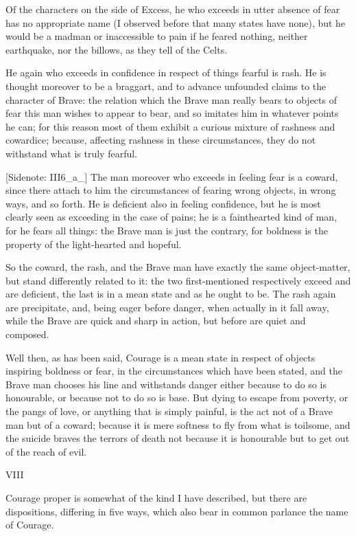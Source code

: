 Of the characters on the side of Excess, he who exceeds in utter absence
of fear has no appropriate name (I observed before that many states have
none), but he would be a madman or inaccessible to pain if he feared
nothing, neither earthquake, nor the billows, as they tell of the Celts.

He again who exceeds in confidence in respect of things fearful is rash.
He is thought moreover to be a braggart, and to advance unfounded claims
to the character of Brave: the relation which the Brave man really bears
to objects of fear this man wishes to appear to bear, and so imitates
him in whatever points he can; for this reason most of them exhibit a
curious mixture of rashness and cowardice; because, affecting rashness
in these circumstances, they do not withstand what is truly fearful.

[Sidenote: III6_a_] The man moreover who exceeds in feeling fear is a
coward, since there attach to him the circumstances of fearing wrong
objects, in wrong ways, and so forth. He is deficient also in feeling
confidence, but he is most clearly seen as exceeding in the case of
pains; he is a fainthearted kind of man, for he fears all things: the
Brave man is just the contrary, for boldness is the property of the
light-hearted and hopeful.

So the coward, the rash, and the Brave man have exactly the same
object-matter, but stand differently related to it: the two
first-mentioned respectively exceed and are deficient, the last is in a
mean state and as he ought to be. The rash again are precipitate, and,
being eager before danger, when actually in it fall away, while the
Brave are quick and sharp in action, but before are quiet and composed.

Well then, as has been said, Courage is a mean state in respect of
objects inspiring boldness or fear, in the circumstances which have been
stated, and the Brave man chooses his line and withstands danger either
because to do so is honourable, or because not to do so is base. But
dying to escape from poverty, or the pangs of love, or anything that is
simply painful, is the act not of a Brave man but of a coward; because
it is mere softness to fly from what is toilsome, and the suicide braves
the terrors of death not because it is honourable but to get out of the
reach of evil.


VIII

Courage proper is somewhat of the kind I have described, but there are
dispositions, differing in five ways, which also bear in common parlance
the name of Courage.

